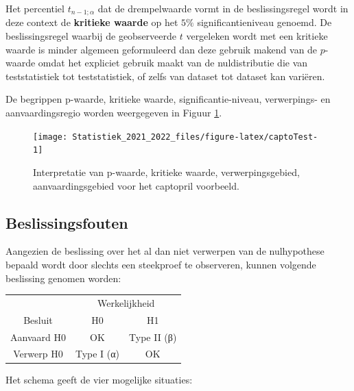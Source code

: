 \documentclass[
  12pt,dutch,coursenotes]{book}
\theoremstyle{definition}
\theoremstyle{definition}
\theoremstyle{definition}
\theoremstyle{definition}
\theoremstyle{remark}
\begin{document}
Het percentiel \(t_{n-1;\alpha}\) dat de drempelwaarde vormt in de beslissingsregel wordt in deze context de \textbf{kritieke waarde} op het \(5\%\) significantieniveau genoemd.
De beslissingsregel waarbij de geobserveerde \(t\) vergeleken wordt met een kritieke waarde is minder algemeen geformuleerd dan deze gebruik makend van de \(p\)-waarde omdat het expliciet gebruik maakt van de nuldistributie die van teststatistiek tot teststatistiek, of zelfs van dataset tot dataset kan variëren.

De begrippen p-waarde, kritieke waarde, significantie-niveau, verwerpings- en aanvaardingsregio worden weergegeven in Figuur \ref{fig:captoTest}.

\begin{figure}

{\centering \texttt{[image: Statistiek\_2021\_2022\_files/figure-latex/captoTest-1]} 

}

\caption{Interpretatie van p-waarde, kritieke waarde, verwerpingsgebied, aanvaardingsgebied voor het captopril voorbeeld.}\label{fig:captoTest}
\end{figure}

\hypertarget{beslissingsfouten}{%
\subsection{Beslissingsfouten}\label{beslissingsfouten}}

Aangezien de beslissing over het al dan niet verwerpen van de nulhypothese bepaald wordt door slechts een steekproef te observeren, kunnen volgende beslissing genomen worden:

\begin{table}
\centering
\begin{tabular}{c|c|c}
\hline
\multicolumn{1}{c|}{ } & \multicolumn{2}{c}{Werkelijkheid} \\
\cline{2-3}
Besluit & H0 & H1\\
\hline
Aanvaard H0 & OK & Type II (β)\\
\hline
Verwerp H0 & Type I (α) & OK\\
\hline
\end{tabular}
\end{table}

Het schema geeft de vier mogelijke situaties:
\end{document}
